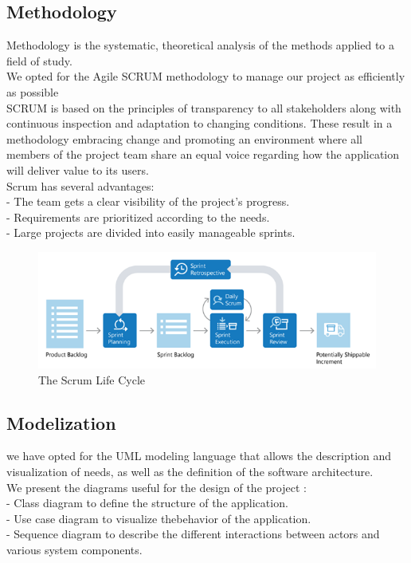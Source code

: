 \subsection{Methodology}
Methodology is the systematic, theoretical analysis of the methods applied to a field of study.\cite{Methodology}\\
We opted for the Agile SCRUM methodology to manage our project as efficiently as possible\\
SCRUM is based on the principles of transparency to all stakeholders along with continuous inspection and adaptation to changing conditions. These result in a methodology embracing change and promoting an environment where all members of the project team share an equal voice regarding how the application will deliver value to its users.\\
Scrum has several advantages:\\
- The team gets a clear visibility of the project's progress.\\
- Requirements are prioritized according to the needs.\\
- Large projects are divided into easily manageable sprints.\\
    \begin{figure}[htpb]
    \centering
    \includegraphics[scale=0.65]{img/scrumLifeCycle.png}
    \caption{The Scrum Life Cycle}
\end{figure}
\subsection{Modelization}
we have opted for the UML modeling language that
allows the description and visualization of needs, as well as the definition of the software architecture.\\
We present the diagrams useful for the design of the project :\\
- Class diagram to define the structure of the application.\\
- Use case diagram to visualize thebehavior of the application.\\
- Sequence diagram to describe the different interactions between actors and various system components.\\



